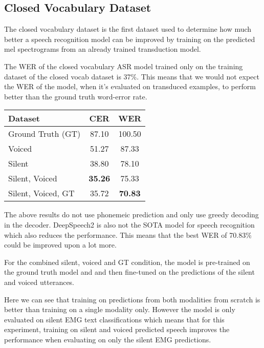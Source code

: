 \subsection{Closed Vocabulary Dataset}

The closed vocabulary dataset is the first dataset used to determine how much better
a speech recognition model can be improved by training on the predicted mel spectrograms
from an already trained transduction model.

The WER of the closed vocabulary ASR model trained only on the training dataset
of the closed vocab dataset is 37\%. This means that we would not expect the WER
of the model, when it's evaluated on transduced examples, to perform better than
the ground truth word-error rate.

{\small\begin{center}
\begin{tabular} {  l  c  c  }
\hline
\textbf{Dataset} & \textbf{CER} & \textbf{WER} \\
\hline
Ground Truth (GT) & 87.10 & 100.50 \\
Voiced & 51.27 & 87.33 \\
Silent & 38.80 & 78.10 \\
Silent, Voiced & \textbf{35.26} & 75.33 \\
\hline
Silent, Voiced, GT & 35.72 & \textbf{70.83} \\
\hline
\end{tabular}
\end{center}}

The above results do not use phonemeic prediction and only use greedy decoding
in the decoder. DeepSpeech2 is also not the SOTA model for speech recognition
which also reduces the performance. This means that the best WER of 70.83\% could
be improved upon a lot more.

For the combined silent, voiced and GT condition, the model is pre-trained on the
ground truth model and and then fine-tuned on the predictions of the
silent and voiced utterances.

Here we can see that training on predictions from both modalities from scratch
is better than training on a single modality only. However the model is only
evaluated on silent EMG text classifications which means that for this experiment,
training on silent and voiced predicted speech improves the performance when
evaluating on only the silent EMG predictions.


